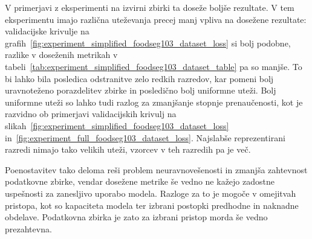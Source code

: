 \documentclass[a4paper,twoside,openright,12pt,slovene]{book}
\begin{document}


            V primerjavi z eksperimenti na izvirni zbirki ta doseže
            boljše rezultate. V tem eksperimentu imajo različna uteževanja
            precej manj vpliva na dosežene rezultate: validacijske krivulje na
            grafih~\ref{fig:experiment_simplified_foodseg103_dataset_loss} si
            bolj podobne, razlike v doseženih metrikah v
            tabeli~\ref{tab:experiment_simplified_foodseg103_dataset_table} pa
            so manjše. To bi lahko bila posledica odstranitve zelo redkih
            razredov, kar pomeni bolj uravnoteženo porazdelitev zbirke in
            posledično bolj uniformne uteži.
            Bolj uniformne uteži so lahko tudi razlog za zmanjšanje stopnje
            prenaučenosti, kot je razvidno ob primerjavi validacijskih krivulj
            na slikah~\ref{fig:experiment_simplified_foodseg103_dataset_loss}
            in~\ref{fig:experiment_full_foodseg103_dataset_loss}. Najslabše
            reprezentirani razredi nimajo tako velikih uteži, vzorcev v teh
            razredih pa je več.

            Poenostavitev tako deloma reši problem neuravnovešenosti in zmanjša
            zahtevnost podatkovne zbirke, vendar dosežene metrike še vedno ne
            kažejo zadostne uspešnosti za zanesljivo uporabo modela. Razloge za
            to je mogoče v omejitvah pristopa, kot so kapaciteta modela ter
            izbrani postopki predhodne in naknadne obdelave. Podatkovna zbirka
            je zato za izbrani pristop morda še vedno prezahtevna.
\end{document}
